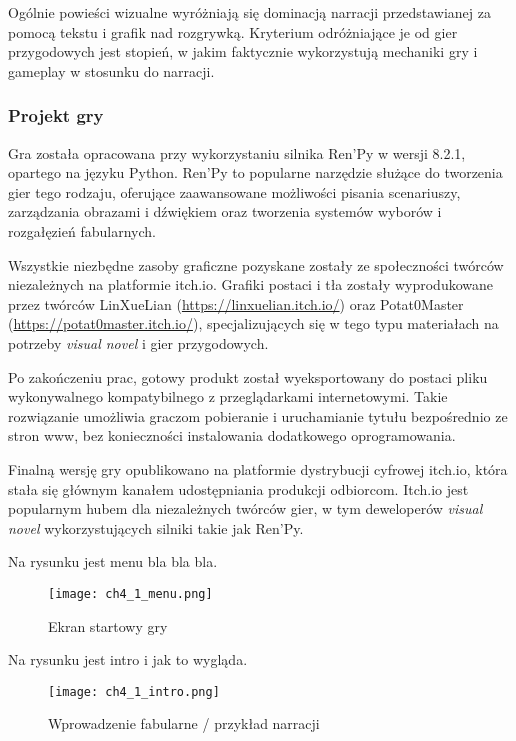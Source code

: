 Ogólnie powieści wizualne wyróżniają się dominacją narracji przedstawianej za pomocą tekstu i grafik nad 
rozgrywką. Kryterium odróżniające je od gier przygodowych jest stopień, w jakim faktycznie 
wykorzystują mechaniki gry i gameplay w stosunku do narracji\cite{tvtropes_visual_novel}.

\subsubsection*{Projekt gry}

Gra została opracowana przy wykorzystaniu silnika Ren'Py w wersji 8.2.1, opartego na języku Python. 
Ren'Py to popularne narzędzie służące do tworzenia gier tego rodzaju, oferujące zaawansowane 
możliwości pisania scenariuszy, zarządzania obrazami i dźwiękiem oraz tworzenia systemów wyborów 
i rozgałęzień fabularnych.

Wszystkie niezbędne zasoby graficzne pozyskane zostały ze społeczności twórców niezależnych na 
platformie itch.io. Grafiki postaci i tła zostały wyprodukowane przez twórców 
LinXueLian (\url{https://linxuelian.itch.io/}) oraz Potat0Master (\url{https://potat0master.itch.io/}), 
specjalizujących się w tego typu materiałach na potrzeby \textit{visual novel} i gier przygodowych.

Po zakończeniu prac, gotowy produkt został wyeksportowany do postaci pliku wykonywalnego 
kompatybilnego z przeglądarkami internetowymi. Takie rozwiązanie umożliwia graczom pobieranie i 
uruchamianie tytułu bezpośrednio ze stron www, bez konieczności instalowania dodatkowego 
oprogramowania.

Finalną wersję gry opublikowano na platformie dystrybucji cyfrowej itch.io, która stała się 
głównym kanałem udostępniania produkcji odbiorcom. Itch.io jest popularnym hubem dla niezależnych 
twórców gier, w tym deweloperów \textit{visual novel} wykorzystujących silniki takie jak Ren'Py.

Na rysunku jest menu bla bla bla.

\begin{figure}[h!]
    \centering
    \texttt{[image: ch4\_1\_menu.png]}
    \caption{Ekran startowy gry}
    \label{fig:ch4_1_menu}
\end{figure}

\newpage
Na rysunku jest intro i jak to wygląda.

\begin{figure}[h!]
    \centering
    \texttt{[image: ch4\_1\_intro.png]}
    \caption{Wprowadzenie fabularne / przykład narracji}
    \label{fig:ch4_1_intro}
\end{figure}

